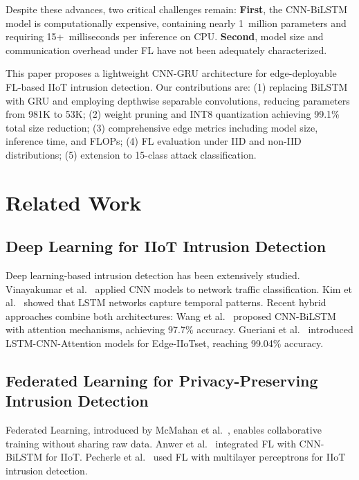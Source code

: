 \documentclass[12pt,a4paper]{article}
\begin{document}
Despite these advances, two critical challenges remain: \textbf{First}, the CNN-BiLSTM model is computationally expensive, containing nearly 1~million parameters and requiring 15+~milliseconds per inference on CPU. \textbf{Second}, model size and communication overhead under FL have not been adequately characterized.

This paper proposes a lightweight CNN-GRU architecture for edge-deployable FL-based IIoT intrusion detection. Our contributions are: (1) replacing BiLSTM with GRU and employing depthwise separable convolutions, reducing parameters from 981K to 53K; (2) weight pruning and INT8 quantization achieving 99.1\% total size reduction; (3) comprehensive edge metrics including model size, inference time, and FLOPs; (4) FL evaluation under IID and non-IID distributions; (5) extension to 15-class attack classification.

\section{Related Work}

\subsection{Deep Learning for IIoT Intrusion Detection}

Deep learning-based intrusion detection has been extensively studied. Vinayakumar et al.~\cite{vinayakumar2017cnn} applied CNN models to network traffic classification. Kim et al.~\cite{kim2019deep} showed that LSTM networks capture temporal patterns. Recent hybrid approaches combine both architectures: Wang et al.~\cite{wang2024industrial} proposed CNN-BiLSTM with attention mechanisms, achieving 97.7\% accuracy. Gueriani et al.~\cite{gueriani2025adaptive} introduced LSTM-CNN-Attention models for Edge-IIoTset, reaching 99.04\% accuracy.

\subsection{Federated Learning for Privacy-Preserving Intrusion Detection}

Federated Learning, introduced by McMahan et al.~\cite{mcmahan2017communication}, enables collaborative training without sharing raw data. Anwer et al.~\cite{anwer2025advanced} integrated FL with CNN-BiLSTM for IIoT. Pecherle et al.~\cite{pecherle2026federated} used FL with multilayer perceptrons for IIoT intrusion detection.
\end{document}
